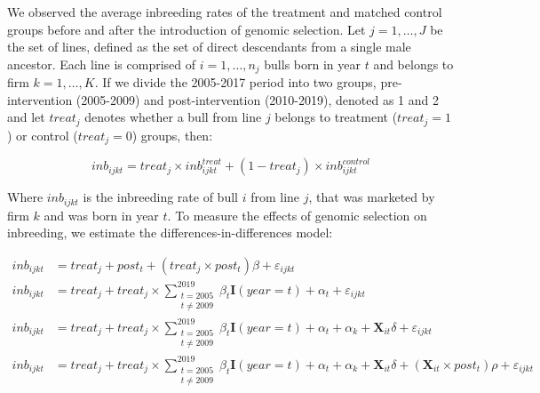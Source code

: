 \documentclass[12pt,letterpaper]{article}
\begin{document}


We observed the average inbreeding rates of the treatment and matched control groups before and after the introduction of genomic selection. 
Let $j=1,\dots, J$ be the set of lines, defined as the set of direct descendants from a single male ancestor. Each line is comprised of $i=1,\dots,n_{j}$ bulls born in year $t$ and belongs to firm $k=1,\dots, K$. 
If we divide the 2005-2017 period into two groups, pre-intervention (2005-2009) and post-intervention (2010-2019), denoted as 1 and 2 and let $treat_{j}$ denotes whether a bull from line $j$ belongs to treatment ($treat_{j}=1$) or control ($treat_{j}=0$) groups, then:

\begin{equation*}
    inb_{ijkt}=treat_{j}\times inb_{ijkt}^{treat}+(1-treat_{j})\times inb_{ijkt}^{control}
\end{equation*}

Where $inb_{ijkt}$ is the inbreeding rate of bull $i$ from line $j$, that was marketed by firm $k$ and was born in year $t$. To measure the effects of genomic selection on inbreeding, we estimate the differences-in-differences model:

\begin{align}
    inb_{ijkt} &= treat_{j}+post_{t}+(treat_{j}\times post_{t})\beta+\varepsilon_{ijkt}\tag{Model 1}\\
    inb_{ijkt} &= treat_{j}+treat_{j}\times\sum_{\substack{t=2005\\t \neq 2009}}^{2019}\beta_{t}\mathbf{I}(year=t)+\alpha_{t}+\varepsilon_{ijkt}\tag{Model 2}\\
    inb_{ijkt} &= treat_{j}+treat_{j}\times\sum_{\substack{t=2005\\t \neq 2009}}^{2019}\beta_{t}\mathbf{I}(year=t)+\alpha_{t}+\alpha_{k}+\mathbf{X}_{it}\delta+\varepsilon_{ijkt}\tag{Model 3}\\
    inb_{ijkt} &= treat_{j}+treat_{j}\times\sum_{\substack{t=2005\\t \neq 2009}}^{2019}\beta_{t}\mathbf{I}(year=t)+\alpha_{t}+\alpha_{k}+\mathbf{X}_{it}\delta+\left(\mathbf{X}_{it}\times post_{t}\right)\rho+\varepsilon_{ijkt}\tag{Model 4}
    \end{align}
\end{document}
